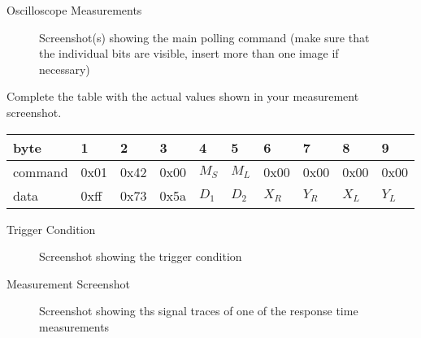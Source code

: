 \documentclass[10pt,a4paper,titlepage,oneside]{article}
\begin{document}
\begin{qa}{Oscilloscope Measurements}
\begin{figure}[h!]
	\centering
	\dummyimage
	\caption{Screenshot(s) showing the main polling command (make sure that the individual bits are visible, insert more than one image if necessary)}
\end{figure}

\begin{center}

Complete the table with the actual values shown in your measurement screenshot.
\begin{center}
\ttfamily
\begin{tabular}{|l|l|l|l|l|l|l|l|l|l|}
\hline
byte    & 1    & 2    & 3    & 4     & 5     & 6     & 7     & 8     & 9    \\ \hline
command & 0x01 & 0x42 & 0x00 & $M_S$ & $M_L$ & 0x00  & 0x00  & 0x00  & 0x00 \\ \hline
data    & 0xff & 0x73 & 0x5a & $D_1$ & $D_2$ & $X_R$ & $Y_R$ & $X_L$ & $Y_L$ \\ \hline
\end{tabular}
\end{center}
\end{center}

\end{qa}




\begin{qa}{Trigger Condition}
	\begin{figure}[h!]
		\centering
		\dummyimage
		\caption{Screenshot showing the trigger condition}
	\end{figure}
\end{qa}

\begin{qa}{Measurement Screenshot}
	\begin{figure}[h!]
		\centering
		\dummyimage
		\caption{Screenshot showing ths signal traces of one of the response time measurements}
	\end{figure}
\end{qa}
\end{document}
